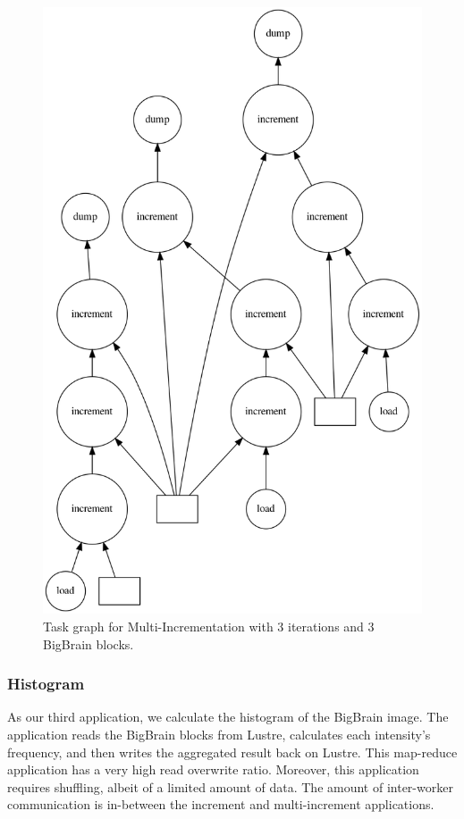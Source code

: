 \documentclass[conference]{IEEEtran}
\begin{document}
\begin{figure}[!hb]
	\centering
	\includegraphics[height=\columnwidth,
	angle=0]{figures/multi-increment.png}
	\caption{Task graph for Multi-Incrementation with 3 iterations and 3 BigBrain blocks.}
	\label{fig:graph-muti-increment}
\end{figure}
	
\subsubsection{Histogram}
As our third application, we calculate the histogram of the BigBrain image. 
The application reads the BigBrain blocks from Lustre, calculates each intensity's frequency, and then writes the aggregated result back on Lustre.
This map-reduce application has a very high read overwrite ratio.
Moreover, this application requires shuffling, albeit of a limited amount of data. 
The amount of inter-worker communication is in-between the increment and multi-increment applications.
\end{document}
